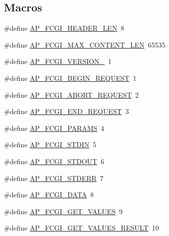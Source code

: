 \subsection*{Macros}
\begin{DoxyCompactItemize}
\item 
\#define \hyperlink{group__APACHE__CORE__FASTCGI_ga48e74e724c1496e1ccf81ce4aa836afc}{A\+P\+\_\+\+F\+C\+G\+I\+\_\+\+H\+E\+A\+D\+E\+R\+\_\+\+L\+EN}~8
\item 
\#define \hyperlink{group__APACHE__CORE__FASTCGI_ga20e89b1b38836a3b9de8a21e7d147e1f}{A\+P\+\_\+\+F\+C\+G\+I\+\_\+\+M\+A\+X\+\_\+\+C\+O\+N\+T\+E\+N\+T\+\_\+\+L\+EN}~65535
\item 
\#define \hyperlink{group__APACHE__CORE__FASTCGI_ga3fbe95d766d824207ef4c833dcc7c5bf}{A\+P\+\_\+\+F\+C\+G\+I\+\_\+\+V\+E\+R\+S\+I\+O\+N\+\_}~1
\item 
\#define \hyperlink{group__APACHE__CORE__FASTCGI_gac6ce814fffdb14e8e5db642700dbda4e}{A\+P\+\_\+\+F\+C\+G\+I\+\_\+\+B\+E\+G\+I\+N\+\_\+\+R\+E\+Q\+U\+E\+ST}~1
\item 
\#define \hyperlink{group__APACHE__CORE__FASTCGI_gab9a6ced979c4db8573822d0a1758828f}{A\+P\+\_\+\+F\+C\+G\+I\+\_\+\+A\+B\+O\+R\+T\+\_\+\+R\+E\+Q\+U\+E\+ST}~2
\item 
\#define \hyperlink{group__APACHE__CORE__FASTCGI_ga782597435fb6f4eea30b1b5e75136510}{A\+P\+\_\+\+F\+C\+G\+I\+\_\+\+E\+N\+D\+\_\+\+R\+E\+Q\+U\+E\+ST}~3
\item 
\#define \hyperlink{group__APACHE__CORE__FASTCGI_gaef6c1b1aebe1a77a6545d5e803fdab9c}{A\+P\+\_\+\+F\+C\+G\+I\+\_\+\+P\+A\+R\+A\+MS}~4
\item 
\#define \hyperlink{group__APACHE__CORE__FASTCGI_ga9b9fef1594cb17cc2b4d199deb2cfd94}{A\+P\+\_\+\+F\+C\+G\+I\+\_\+\+S\+T\+D\+IN}~5
\item 
\#define \hyperlink{group__APACHE__CORE__FASTCGI_gade87fab84da59b5f2acf7eca875b4c11}{A\+P\+\_\+\+F\+C\+G\+I\+\_\+\+S\+T\+D\+O\+UT}~6
\item 
\#define \hyperlink{group__APACHE__CORE__FASTCGI_ga683cb4eb8fad7bcd081b2c7054d7c08f}{A\+P\+\_\+\+F\+C\+G\+I\+\_\+\+S\+T\+D\+E\+RR}~7
\item 
\#define \hyperlink{group__APACHE__CORE__FASTCGI_ga2b5f0dcffc834a589e2900a63e9cc592}{A\+P\+\_\+\+F\+C\+G\+I\+\_\+\+D\+A\+TA}~8
\item 
\#define \hyperlink{group__APACHE__CORE__FASTCGI_ga824b56f361061122ef2047d5caf7fb1a}{A\+P\+\_\+\+F\+C\+G\+I\+\_\+\+G\+E\+T\+\_\+\+V\+A\+L\+U\+ES}~9
\item 
\#define \hyperlink{group__APACHE__CORE__FASTCGI_gafa4ab8a47dca1bbd0de9a5894802c8c1}{A\+P\+\_\+\+F\+C\+G\+I\+\_\+\+G\+E\+T\+\_\+\+V\+A\+L\+U\+E\+S\+\_\+\+R\+E\+S\+U\+LT}~10

\end{DoxyCompactItemize}
